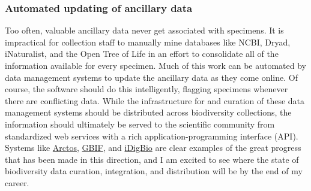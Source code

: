 \documentclass[10pt]{article}
\begin{document}
\subsubsection*{Automated updating of ancillary data}
Too often, valuable ancillary data never get associated with specimens.
It is impractical for collection staff to manually mine databases like NCBI,
Dryad, iNaturalist, and the Open Tree of Life in an effort to consolidate all
of the information available for every specimen.
Much of this work can be automated by data management systems to update the
ancillary data as they come online.
Of course, the software should do this intelligently, flagging specimens
whenever there are conflicting data.
While the infrastructure for and curation of these data management systems
should be distributed across biodiversity collections, the information should
ultimately be served to the scientific community from standardized
web services with a rich application-programming interface (API).
Systems like
\href{https://arctosdb.org/}{Arctos},
\href{https://www.gbif.org/}{GBIF},
and
\href{https://www.idigbio.org/}{iDigBio}
are clear examples of the great progress that has been made in this direction,
and I am excited to see where the state of
biodiversity data curation, integration, and distribution
will be by the end of my career.




\end{document}
